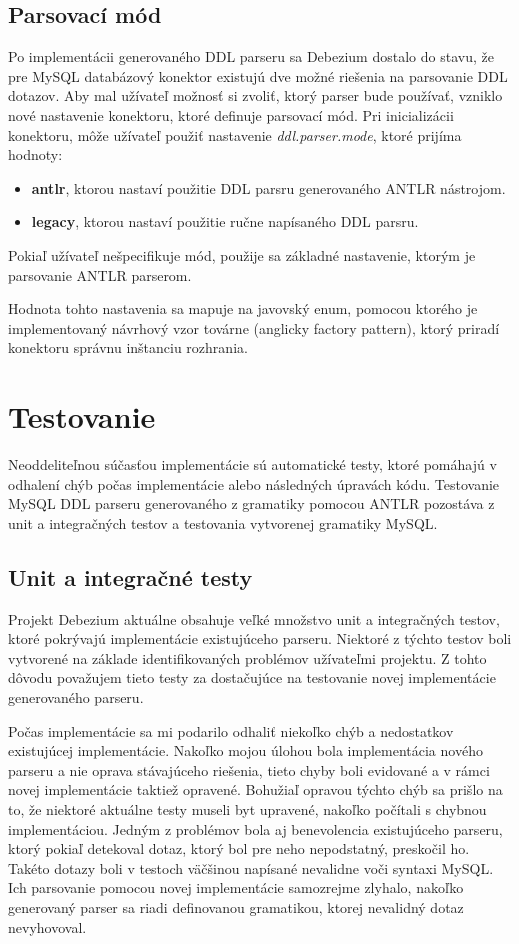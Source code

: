 \subsection{Parsovací mód}
Po implementácii generovaného DDL parseru sa Debezium dostalo do stavu, že pre MySQL databázový konektor existujú dve možné riešenia na parsovanie DDL dotazov. Aby mal užívateľ možnosť si zvoliť, ktorý parser bude používať, vzniklo nové nastavenie konektoru, ktoré definuje parsovací mód. Pri inicializácii konektoru, môže užívateľ použiť nastavenie \textit{ddl.parser.mode}, ktoré prijíma hodnoty:

\begin{itemize}
\item \textbf{antlr}, ktorou nastaví použitie DDL parsru generovaného ANTLR nástrojom.
\item \textbf{legacy}, ktorou nastaví použitie ručne napísaného DDL parsru.
\end{itemize}

Pokiaľ užívateľ nešpecifikuje mód, použije sa základné nastavenie, ktorým je parsovanie ANTLR parserom.

Hodnota tohto nastavenia sa mapuje na javovský enum, pomocou ktorého je implementovaný návrhový vzor továrne (anglicky factory pattern), ktorý priradí konektoru správnu inštanciu  rozhrania.

\section{Testovanie}
Neoddeliteľnou súčasťou implementácie sú automatické testy, ktoré pomáhajú v odhalení chýb počas implementácie alebo následných úpravách kódu. Testovanie MySQL DDL parseru generovaného z gramatiky pomocou ANTLR pozostáva z unit a integračných testov a testovania vytvorenej gramatiky MySQL.

\subsection{Unit a integračné testy}
Projekt Debezium aktuálne obsahuje veľké množstvo unit a integračných testov, ktoré pokrývajú implementácie existujúceho parseru. Niektoré z týchto testov boli vytvorené na základe identifikovaných problémov užívateľmi projektu. Z tohto dôvodu považujem tieto testy za dostačujúce na testovanie novej implementácie generovaného parseru. 

Počas implementácie sa mi podarilo odhaliť niekoľko chýb a nedostatkov existujúcej implementácie. Nakoľko mojou úlohou bola implementácia nového parseru a nie oprava stávajúceho riešenia, tieto chyby boli evidované a v rámci novej implementácie taktiež opravené. Bohužiaľ opravou týchto chýb sa prišlo na to, že niektoré aktuálne testy museli byt upravené, nakoľko počítali s chybnou implementáciou. Jedným z problémov bola aj benevolencia existujúceho parseru, ktorý pokiaľ detekoval dotaz, ktorý bol pre neho nepodstatný, preskočil ho. Takéto dotazy boli v testoch väčšinou napísané nevalidne voči syntaxi MySQL. Ich parsovanie pomocou novej implementácie samozrejme zlyhalo, nakoľko generovaný parser sa riadi definovanou gramatikou, ktorej nevalidný dotaz nevyhovoval.

